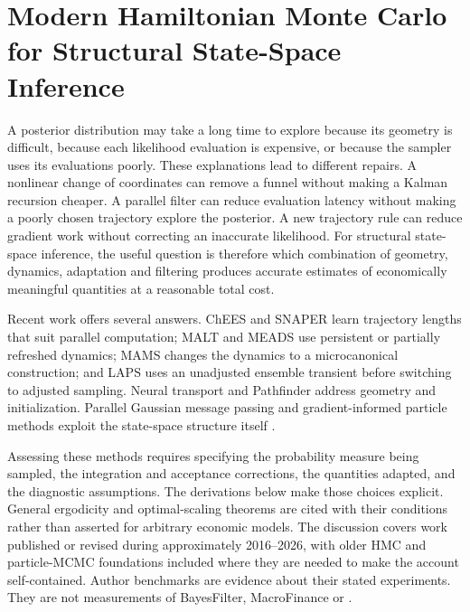 \chapter[Modern HMC for State-Space Inference]{Modern Hamiltonian Monte Carlo for Structural State-Space Inference}
\label{ch:bf-modern-hmc}

A posterior distribution may take a long time to explore because its geometry
is difficult, because each likelihood evaluation is expensive, or because the
sampler uses its evaluations poorly. These explanations lead to different
repairs. A nonlinear change of coordinates can remove a funnel without making
a Kalman recursion cheaper. A parallel filter can reduce evaluation latency
without making a poorly chosen trajectory explore the posterior. A new
trajectory rule can reduce gradient work without correcting an inaccurate
likelihood. For structural state-space inference, the useful question is
therefore which combination of geometry, dynamics, adaptation and filtering
produces accurate estimates of economically meaningful quantities at a
reasonable total cost.

Recent work offers several answers. ChEES and SNAPER learn trajectory lengths
that suit parallel computation; MALT and MEADS use persistent or partially
refreshed dynamics; MAMS changes the dynamics to a microcanonical construction;
and LAPS uses an unadjusted ensemble transient before switching to adjusted
sampling. Neural transport and Pathfinder address geometry and initialization.
Parallel Gaussian message passing and gradient-informed particle methods
exploit the state-space structure itself
\citep{hoffman2021chees,sountsov2022snaper,rioudurand2023malt,
hoffman2022meads,robnik2025mams,robnik2026laps,hoffman2019neutra,
zhang2022pathfinder,sarkka2020parallel,corenflos2024particlemala}.

Assessing these methods requires specifying the probability measure
being sampled, the integration and acceptance corrections, the quantities
adapted, and the diagnostic assumptions. The derivations below make those
choices explicit. General ergodicity and optimal-scaling
theorems are cited with their conditions rather than asserted for arbitrary
economic models. The discussion covers work published or revised during
approximately 2016--2026, with older HMC and particle-MCMC foundations included
where they are needed to make the account self-contained. Author benchmarks
are evidence about their stated experiments. They are not measurements of
BayesFilter, MacroFinance or .

